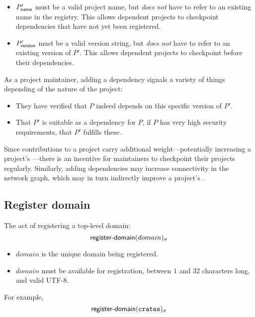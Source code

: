 
\bigskip
\validation
\begin{itemize}
    \item $P'_{\mathsf{name}}$ must be a valid project name, but \emph{does not}
        have to refer to an existing name in the registry. This allows dependent
        projects to checkpoint dependencies that have not yet been registered.
    \item $P'_{\mathsf{version}}$ must be a valid version string, but \emph{does not}
        have to refer to an existing version of $P'$. This allows dependent projects
        to checkpoint before their dependencies.
\end{itemize}

As a project maintainer, adding a dependency signals a variety of things
depending of the nature of the project:
\begin{itemize}
\item They have verified that $P$ indeed depends on this specific
  version of $P'$.
\item That $P'$ is suitable as a dependency for $P$, \eg{} if $P$ has
  very high security requirements, that $P'$ fulfills these.
\end{itemize}
\noindent Since contributions to a project carry additional
weight---potentially increasing a project's \osrank{}---there is an incentive
for maintainers to checkpoint their projects regularly.  Similarly, adding
dependencies may increase connectivity in the network graph, which may in turn
indirectly improve a project's \osrank{}.

\subsection{Register domain}
The act of registering a top-level domain:
\[
    \mathsf{register\hbox{-}domain}\lparen domain\rparen_\sigma
\]
\begin{itemize}
    \item $domain$ is the unique domain being registered.
\end{itemize}
\validation
\begin{itemize}
    \item $domain$ must be available for registration, between $1$ and $32$
        characters long, and valid UTF-8.
\end{itemize}
For example,
\[
    \mathsf{register\hbox{-}domain}\lparen\mathtt{crates}\rparen_\sigma
\]

